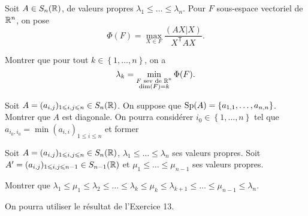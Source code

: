 \documentclass[12pt]{article}
\begin{document}
\begin{exercise}
	Soit $A\in S_n(\mathbb{R})$, de valeurs propres $\lambda_1\leqslant\dots\leqslant\lambda_n$. Pour $F$ sous-espace vectoriel de $\mathbb{R}^{n}$, on pose 
	\begin{equation}
		\Phi(F)=\max\limits_{X\in F}\frac{(AX|X)}{X^{\mathsf{T}}AX}.
	\end{equation}

	Montrer que pour tout $k\in\left\lbrace1,\dots,n\right\rbrace$, on a 
	\begin{equation}
		\lambda_k=\min\limits_{\substack{F\text{ sev de }\mathbb{R}^{n}\\\dim(F)=k}}\Phi(F).
	\end{equation}
\end{exercise}

\begin{exercise}
	Soit $A=(a_{i,j})_{1\leqslant i,j\leqslant n}\in S_n(\mathbb{R})$. On suppose que $\operatorname{Sp}(A)=\left\lbrace a_{1,1},\dots,a_{n,n}\right\rbrace$. Montrer que $A$ est diagonale. On pourra considérer $i_{0}\in\left\lbrace 1,\dots,n\right\rbrace$ tel que $a_{i_{0},i_{0}}=\min(a_{i,i})_{1\leqslant i\leqslant n}$ et former 
\end{exercise}

\begin{exercise}
	Soit $A=(a_{i,j})_{1\leqslant i,j\leqslant n}\in S_n(\mathbb{R})$, $\lambda_{1}\leqslant \dots\leqslant \lambda_{n}$ ses valeurs propres. Soit $A'=(a_{i,j})_{1\leqslant i,j\leqslant n-1}\in S_{n-1}(\mathbb{R})$ et $\mu_{1}\leqslant\dots\leqslant\mu_{n-1}$ ses valeurs propres.

	Montrer que $\lambda_{1}\leqslant\mu_{1}\leqslant\lambda_{2}\leqslant\dots\leqslant\lambda_{k}\leqslant\mu_k\leqslant\lambda_{k+1}\leqslant\dots\leqslant\mu_{n-1}\leqslant\lambda_n$.

	On pourra utiliser le résultat de l'Exercice 13.
\end{exercise}
\end{document}
